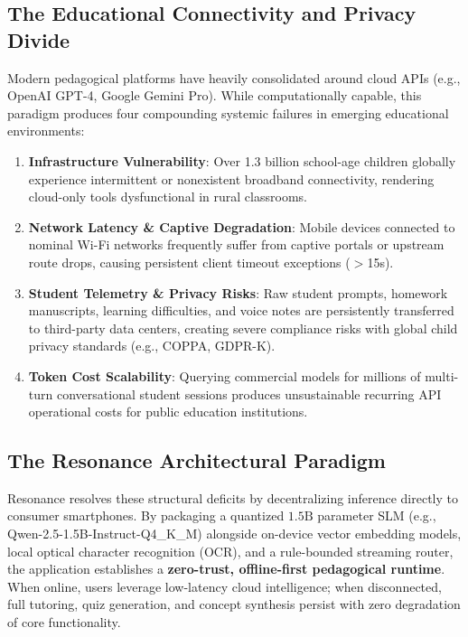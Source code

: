 \documentclass[10.5pt,a4paper]{article}
\begin{document}
\subsection{The Educational Connectivity and Privacy Divide}
Modern pedagogical platforms have heavily consolidated around cloud APIs (e.g., OpenAI GPT-4, Google Gemini Pro). While computationally capable, this paradigm produces four compounding systemic failures in emerging educational environments:
\begin{enumerate}[leftmargin=*,itemsep=0.5pt,topsep=1pt]
  \item \textbf{Infrastructure Vulnerability}: Over 1.3 billion school-age children globally experience intermittent or nonexistent broadband connectivity, rendering cloud-only tools dysfunctional in rural classrooms.
  \item \textbf{Network Latency \& Captive Degradation}: Mobile devices connected to nominal Wi-Fi networks frequently suffer from captive portals or upstream route drops, causing persistent client timeout exceptions ($>$15s).
  \item \textbf{Student Telemetry \& Privacy Risks}: Raw student prompts, homework manuscripts, learning difficulties, and voice notes are persistently transferred to third-party data centers, creating severe compliance risks with global child privacy standards (e.g., COPPA, GDPR-K).
  \item \textbf{Token Cost Scalability}: Querying commercial models for millions of multi-turn conversational student sessions produces unsustainable recurring API operational costs for public education institutions.
\end{enumerate}

\subsection{The Resonance Architectural Paradigm}
Resonance resolves these structural deficits by decentralizing inference directly to consumer smartphones. By packaging a quantized $1.5\text{B}$ parameter SLM (e.g., Qwen-2.5-1.5B-Instruct-Q4\_K\_M) alongside on-device vector embedding models, local optical character recognition (OCR), and a rule-bounded streaming router, the application establishes a \textbf{zero-trust, offline-first pedagogical runtime}. When online, users leverage low-latency cloud intelligence; when disconnected, full tutoring, quiz generation, and concept synthesis persist with zero degradation of core functionality.
\end{document}
